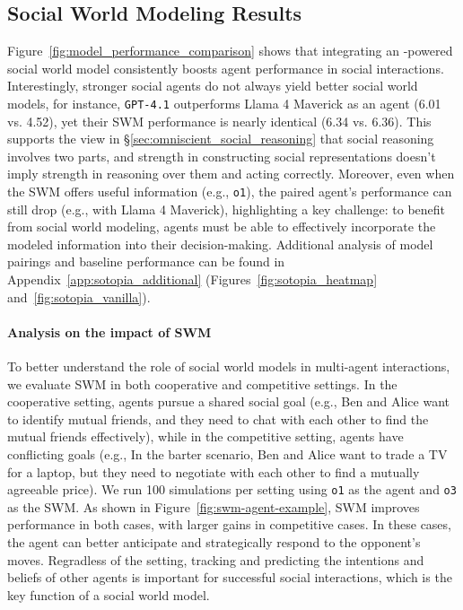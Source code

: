 \subsection{Social World Modeling Results}
Figure~\ref{fig:model_performance_comparison} shows that integrating an \protocolname-powered social world model consistently boosts agent performance in social interactions. %
Interestingly, stronger social agents do not always yield better social world models, for instance, \texttt{GPT-4.1} outperforms Llama 4 Maverick as an agent (6.01 vs. 4.52), yet their SWM performance is nearly identical (6.34 vs. 6.36).
This supports the view in \S\ref{sec:omniscient_social_reasoning} that social reasoning involves two parts, and strength in constructing social representations doesn't imply strength in reasoning over them and acting correctly.
Moreover, even when the SWM offers useful information (e.g., \texttt{o1}), the paired agent's performance can still drop (e.g., with Llama 4 Maverick), highlighting a key challenge: to benefit from social world modeling, agents must be able to effectively incorporate the modeled information into their decision-making.
Additional analysis of model pairings and baseline performance can be found in Appendix~\ref{app:sotopia_additional} (Figures~\ref{fig:sotopia_heatmap} and~\ref{fig:sotopia_vanilla}).


\paragraph{Analysis on the impact of SWM}
To better understand the role of social world models in multi-agent interactions, we evaluate SWM in both cooperative and competitive settings.
In the cooperative setting, agents pursue a shared social goal (e.g., Ben and Alice want to identify mutual friends, and they need to chat with each other to find the mutual friends effectively), while in the competitive setting, agents have conflicting goals (e.g., In the barter scenario, Ben and Alice want to trade a TV for a laptop, but they need to negotiate with each other to find a mutually agreeable price).
We run 100 simulations per setting using \texttt{o1} as the agent and \texttt{o3} as the SWM. As shown in Figure~\ref{fig:swm-agent-example}, SWM improves performance in both cases, with larger gains in competitive cases. 
In these cases, the agent can better anticipate and strategically respond to the opponent's moves.
Regradless of the setting, tracking and predicting the intentions and beliefs of other agents is important for successful social interactions, which is the key function of a social world model.













